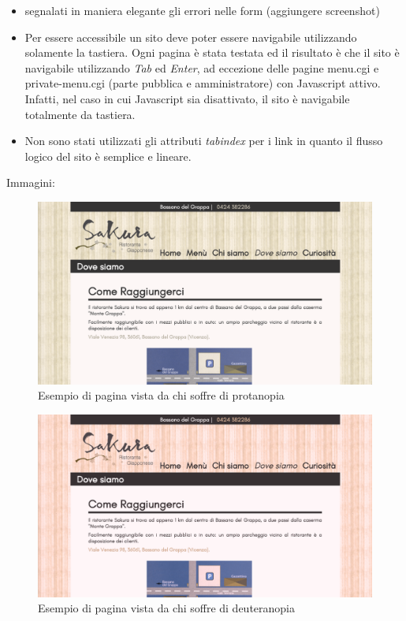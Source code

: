 \documentclass[../relazione.tex]{subfiles}
\begin{document}
\begin{itemize}
		\item segnalati in maniera elegante gli errori nelle form (aggiungere screenshot)
		\item Per essere accessibile un sito deve poter essere navigabile utilizzando solamente la tastiera. Ogni pagina è stata testata ed il risultato è che il sito è navigabile utilizzando \textit{Tab} ed \textit{Enter}, ad eccezione delle pagine menu.cgi e private-menu.cgi (parte pubblica e amministratore) con Javascript attivo. Infatti, nel caso in cui Javascript sia disattivato, il sito è navigabile totalmente da tastiera.
		\item Non sono stati utilizzati gli attributi \textit{tabindex} per i link in quanto il flusso logico del sito è semplice e lineare.
	\end{itemize}
	Immagini:
	\begin{figure}[H]
	\centering
		\includegraphics[width=\textwidth]{images/colorblindness/protanopia}
		\caption{Esempio di pagina vista da chi soffre di protanopia}
		\label{fig:Esempio di pagina vista da chi soffre di protanopia}
	\end{figure}
	\begin{figure}[H]
	\centering
		\includegraphics[width=\textwidth]{images/colorblindness/deuteranopia}
		\caption{Esempio di pagina vista da chi soffre di deuteranopia}
		\label{fig:Esempio di pagina vista da chi soffre di deuteranopia}
	\end{figure}
\end{document}
